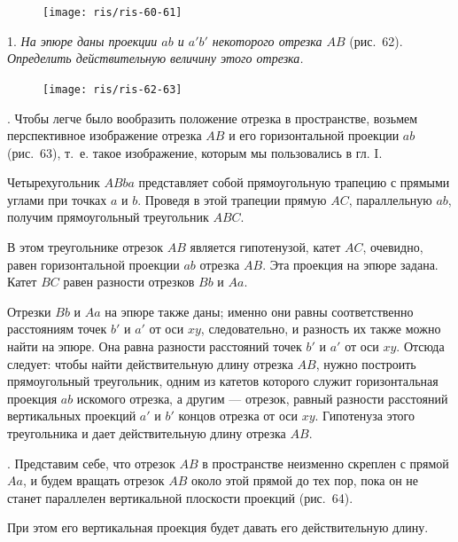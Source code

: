 \documentclass[twoside]{book}
\begin{document}
\begin{figure}[h!]
\centering
\texttt{[image: ris/ris-60-61]}
\caption{}
\end{figure}

 1.
\emph{На эпюре даны проекции $ab$ и $a'b'$ некоторого отрезка $AB$} (рис.~62).
\emph{Определить действительную величину этого отрезка.}

\begin{figure}[h!]
\centering
\texttt{[image: ris/ris-62-63]}
\caption{}
\end{figure}

.
Чтобы легче было вообразить положение отрезка в пространстве, возьмем перспективное изображение отрезка $AB$ и его горизонтальной проекции $ab$ (рис.~63), т.~е. такое изображение, которым мы пользовались в гл. I.

Четырехугольник $ABba$ представляет собой прямоугольную трапецию с прямыми углами при точках $a$ и $b$. %
Проведя в этой трапеции прямую $AC$, параллельную $ab$, получим прямоугольный треугольник $ABC$.

В этом треугольнике отрезок $AB$ является гипотенузой, катет $AC$, очевидно, равен горизонтальной проекции $ab$ отрезка $AB$.
Эта проекция на эпюре задана.
Катет $BC$ равен разности отрезков $Bb$ и $Aa$.

Отрезки $Bb$ и $Aa$ на эпюре также даны;
именно они равны соответственно расстояниям точек $b'$ и $a'$ от оси $xy$, следовательно, и разность их также можно найти на эпюре. %
Она равна разности расстояний точек $b'$ и $a'$ от оси $xy$.
Отсюда следует: чтобы найти действительную длину отрезка $AB$, нужно построить прямоугольный треугольник, одним из катетов которого служит горизонтальная проекция $ab$ искомого отрезка, а другим --- отрезок, равный разности расстояний вертикальных проекций $a'$ и $b'$ концов отрезка от оси $xy$.
Гипотенуза этого треугольника и дает действительную длину отрезка $AB$.

.
Представим себе, что отрезок $AB$ в пространстве неизменно скреплен с прямой $Aa$, и будем вращать отрезок $AB$ около этой прямой до тех пор, пока он не станет параллелен вертикальной плоскости проекций (рис.~64). %

При этом его вертикальная проекция будет давать его действительную длину.
\end{document}
